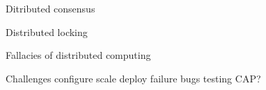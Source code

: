 Ditributed consensus

Distributed locking

Fallacies of distributed computing

Challenges
  configure
  scale
  deploy
  failure
  bugs
  testing
  CAP?
